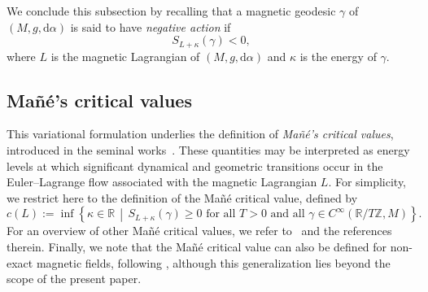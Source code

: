 \documentclass[11pt,reqno]{amsart}
\theoremstyle{plain}
\theoremstyle{definition}
\numberwithin{equation}{section}
\def\d{\delta}
\def\k{\kappa}
\def\d{\delta}
\def\k{\kappa}
\def\d{{\mathrm{d}}}
\begin{document}
We conclude this subsection by recalling that a magnetic geodesic \(\gamma\) of
\((M,g,\d\alpha)\) is said to have \emph{negative action} if
\[
S_{L+\kappa}(\gamma)<0,
\]
where \(L\) is the magnetic Lagrangian of \((M,g,\d\alpha)\) and \(\kappa\) is
the energy of \(\gamma\).

\subsection{Mañé's critical values}

This variational formulation underlies the definition of \emph{Mañé's critical
values}, introduced in the seminal works~\cite{CIPP,Man}. These quantities may
be interpreted as energy levels at which significant dynamical and geometric
transitions occur in the Euler--Lagrange flow associated with the magnetic
Lagrangian \(L\). For simplicity, we restrict here to the definition of the Mañé critical value,
defined by
\begin{equation}\label{eq: strict mane value}
    c(L):=
    \inf\left\{
    \kappa\in\mathbb{R}
    \,\middle|\,
    S_{L+\kappa}(\gamma)\geq 0
    \text{ for all } T>0
    \text{ and all }
    \gamma\in C^\infty(\mathbb{R}/T\mathbb{Z},M)
    \right\}.
\end{equation}
For an overview of other Mañé critical values, we refer to~\cite{Abbo13Lect}
and the references therein. Finally, we note that the Mañé critical value can
also be defined for non-exact magnetic fields, following
\cite{CFP10,Me09}, although this generalization lies beyond the scope of the
present paper.

\end{document}
